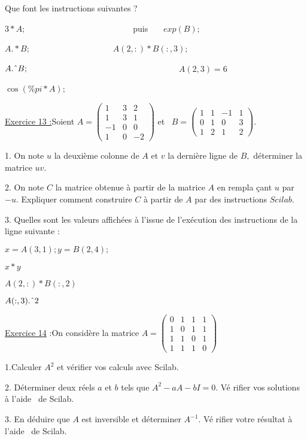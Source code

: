 \documentclass{article}
\begin{document}
Que font les instructions suivantes ?

$3\ast A;$ $\ \ $\ \ \ \ \ \ \ \ \ \ \ \ \ \ \ \ \ \ \ \ \ \ \ \ puis \ \ \ $%
exp(B);$

$A.\ast B;$ $\ \ \ \ \ \ \ \ \ \ \ \ \ \ \ \ \ \ \ \ \ \ \ \ \ \ \ \ \ \ \ \
\ \ \ \ \ \ \ \ \ \ \ A(2,:)\ast B(:,3);\ $

$A.\symbol{94}B;$ $\ $\ \ \ \ \ \ \ \ \ \ \ \ \ \ \ \ \ \ \ \ \ \ \ \ \ \ \
\ \ \ \ \ \ \ \ $A(2,3)=6$

$\cos (\%pi\ast A);$ \ $\ $ $\ $ \ 

\underline{Exercice 13 :}Soient $A=\left( 
\begin{array}{ccc}
1 & 3 & 2 \\ 
1 & 3 & 1 \\ 
-1 & 0 & 0 \\ 
1 & 0 & -2%
\end{array}%
\right) $ et \ $B=\left( 
\begin{array}{cccc}
1 & 1 & -1 & 1 \\ 
0 & 1 & 0 & 3 \\ 
1 & 2 & 1 & 2%
\end{array}%
\right) .$

1. On note $u$ la deuxi\`{e}me colonne de $A$ et $v$ la derni\`{e}re ligne
de $B,$ d\'{e}terminer la matrice $uv.$

2. On note $C$ la matrice obtenue \`{a} partir de la matrice $A$ en rempla%
\c{c}ant $u$ par $-u.$ Expliquer comment construire $C$ \`{a} partir de $A$
par des instructions $Scilab.$

3. Quelles sont les valeurs affich\'{e}es \`{a} l'issue de l'ex\'{e}cution
des instructions de la ligne suivante :

$x=A(3,1);y=B(2,4);$

$x\ast y$

$A(2,:)\ast B(:,2)$

$A(:,3).\symbol{94}2$

\underline{Exercice 14} :On consid\`{e}re la matrice $A=%
\begin{pmatrix}
0 & 1 & 1 & 1 \\ 
1 & 0 & 1 & 1 \\ 
1 & 1 & 0 & 1 \\ 
1 & 1 & 1 & 0%
\end{pmatrix}%
\quad $

1.Calculer $A^{2}$ et v\'{e}rifier vos calculs avec Scilab.

2. D\'{e}terminer deux r\'{e}els $a$ et $b$ tels que $A^{2}-aA-bI=0.$ V\'{e}%
rifier vos solutions \`{a} l'aide \ de Scilab.

3. En d\'{e}duire que $A$ est inversible et d\'{e}terminer $A^{-1}.$ V\'{e}%
rifier votre r\'{e}sultat \`{a} l'aide \ de Scilab.
\end{document}

